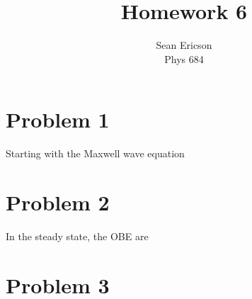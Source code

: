 \documentclass[12pt]{article}
\begin{document}
	
\title{Homework 6}
\author{Sean Ericson \\ Phys 684}
\maketitle

\section*{Problem 1}
Starting with the Maxwell wave equation

\section*{Problem 2}
In the steady state, the OBE are


\section*{Problem 3}

%
\end{document}
